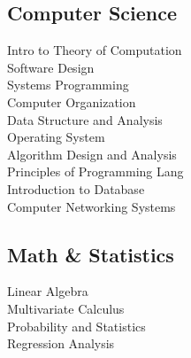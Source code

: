 \documentclass[]{deedy-resume-openfont}
\begin{document}
\begin{minipage}[t]{0.33\textwidth}
    \subsection{Computer Science}
    Intro to Theory of Computation \\ 
    Software Design \\ 
    Systems Programming \\ 
    Computer Organization \\ 
    Data Structure and Analysis \\
    Operating System \\
    Algorithm Design and Analysis \\
    Principles of Programming Lang \\
    Introduction to Database \\
    Computer Networking Systems \\
    
    \sectionsep
    \subsection{Math \& Statistics}
    Linear Algebra  \\
    Multivariate Calculus \\ 
    Probability and Statistics \\
    Regression Analysis \\ 
    
    
    
    \end{minipage} 
    \hfill
\end{document}
